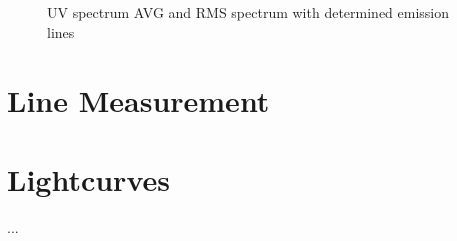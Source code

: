 \begin{figure}[!htbp]
	\centering
	\caption{UV spectrum AVG and RMS spectrum with determined emission lines}
	\label{fig:UV_uncalibrated_AVG_RMS}
\end{figure}


\section{Line Measurement}




\section{Lightcurves}
...
